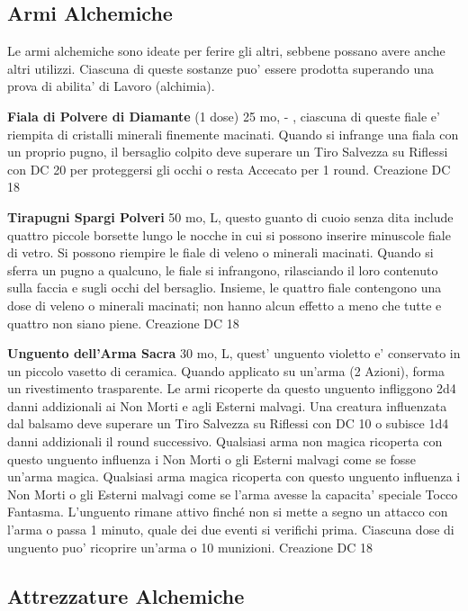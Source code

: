 \documentclass[a4paper,11pt,twoside,openany]{book}
\begin{document}
{\pagebreak

\subsection{Armi Alchemiche}

\label{armi-alchemiche}

Le armi alchemiche sono ideate per ferire gli altri, sebbene possano avere anche altri utilizzi. Ciascuna di queste sostanze puo' essere prodotta superando una prova di abilita' di Lavoro (alchimia).

\textbf{Fiala di Polvere di Diamante} (1 dose) 25 mo, - , ciascuna di queste fiale e' riempita di cristalli minerali finemente macinati. Quando si infrange una fiala con un proprio pugno, il bersaglio colpito deve superare un Tiro Salvezza su Riflessi con DC 20 per proteggersi gli occhi o resta Accecato per 1 round. Creazione DC 18

\textbf{Tirapugni Spargi Polveri} 50 mo, L, questo guanto di cuoio senza dita include quattro piccole borsette lungo le nocche in cui si possono inserire minuscole fiale di vetro. Si possono riempire le fiale di veleno o minerali macinati. 
Quando si sferra un pugno a qualcuno, le fiale si infrangono, rilasciando il loro contenuto sulla faccia e sugli occhi del bersaglio. Insieme, le quattro fiale contengono una dose di veleno o minerali macinati; non hanno alcun effetto a meno che tutte e quattro non siano piene. Creazione DC 18

\textbf{Unguento dell'Arma Sacra} 30 mo, L, quest' unguento violetto e' conservato in un piccolo vasetto di ceramica. Quando applicato su un'arma (2 Azioni), forma un rivestimento trasparente. Le armi ricoperte da questo unguento infliggono 2d4 danni addizionali ai Non Morti e agli Esterni malvagi. 
Una creatura influenzata dal balsamo deve superare un Tiro Salvezza su Riflessi con DC 10 o subisce 1d4 danni addizionali il round successivo. Qualsiasi arma non magica ricoperta con questo unguento influenza i Non Morti o gli Esterni malvagi come se fosse un'arma magica. Qualsiasi arma magica ricoperta con questo unguento influenza i Non Morti o gli Esterni malvagi come se l'arma avesse la capacita' speciale Tocco Fantasma. L'unguento rimane attivo finché non si mette a segno un attacco con l'arma o passa 1 minuto, quale dei due eventi si verifichi prima. Ciascuna dose di unguento puo' ricoprire un'arma o 10 munizioni. Creazione DC 18

\subsection{Attrezzature Alchemiche}

}
\end{document}
